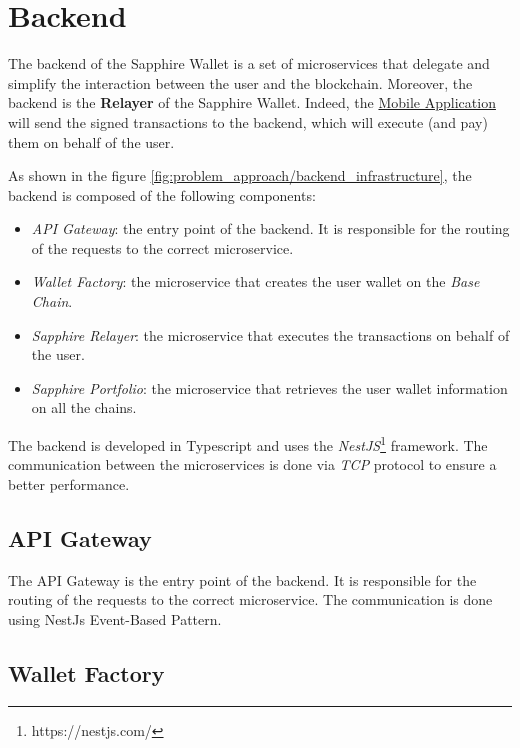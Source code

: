 \section{Backend}
\label{sec:backend}

The backend of the Sapphire Wallet is a set of microservices that delegate and simplify the interaction between the user and the blockchain. Moreover, the backend is the \textbf{Relayer} of the Sapphire Wallet. Indeed, the \hyperref[sec:mobile_application]{Mobile Application} will send the signed transactions to the backend, which will execute (and pay) them on behalf of the user.

As shown in the figure \ref{fig:problem_approach/backend_infrastructure}, the backend is composed of the following components:
\begin{itemize}
    \item \textit{API Gateway}: the entry point of the backend. It is responsible for the routing of the requests to the correct microservice.
    \item \textit{Wallet Factory}: the microservice that creates the user wallet on the \textit{Base Chain}.
    \item \textit{Sapphire Relayer}: the microservice that executes the transactions on behalf of the user.
    \item \textit{Sapphire Portfolio}: the microservice that retrieves the user wallet information on all the chains.
\end{itemize}


The backend is developed in Typescript and uses the \textit{NestJS}\footnote{https://nestjs.com/} framework. The communication between the microservices is done via \textit{TCP} protocol to ensure a better performance. 

\subsection{API Gateway}
\label{subsec:api_gateway}

The API Gateway is the entry point of the backend. It is responsible for the routing of the requests to the correct microservice. The communication is done using NestJs Event-Based Pattern. 

\subsection{Wallet Factory}
\label{subsec:wallet_factory}

